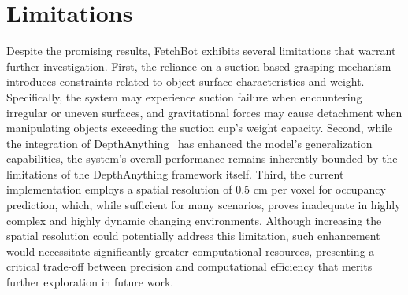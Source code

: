 \section{Limitations}
Despite the promising results, FetchBot exhibits several limitations that warrant further investigation. First, the reliance on a suction-based grasping mechanism introduces constraints related to object surface characteristics and weight. Specifically, the system may experience suction failure when encountering irregular or uneven surfaces, and gravitational forces may cause detachment when manipulating objects exceeding the suction cup's weight capacity. Second, while the integration of DepthAnything~\cite{yang2024depth} has enhanced the model's generalization capabilities, the system's overall performance remains inherently bounded by the limitations of the DepthAnything framework itself. Third, the current implementation employs a spatial resolution of 0.5 cm per voxel for occupancy prediction, which, while sufficient for many scenarios, proves inadequate in highly complex and highly dynamic changing environments. Although increasing the spatial resolution could potentially address this limitation, such enhancement would necessitate significantly greater computational resources, presenting a critical trade-off between precision and computational efficiency that merits further exploration in future work.

